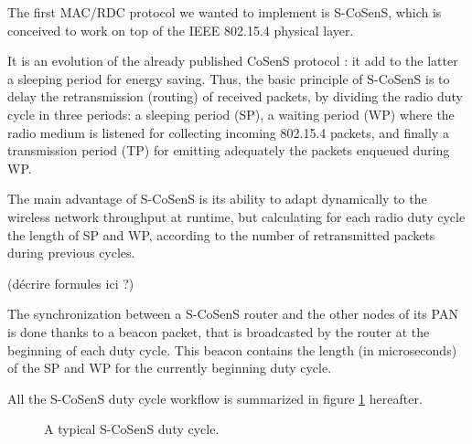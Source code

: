 \documentclass[a4paper,twoside]{article}
\begin{document}
The first MAC/RDC protocol we wanted to implement is S-CoSenS, which
is conceived to work on top of the IEEE 802.15.4 physical layer.

It is an evolution of the already published CoSenS protocol \cite{Cosens}:
it add to the latter a sleeping period for energy saving.
Thus, the basic principle of S-CoSenS is to delay the retransmission
(routing) of received packets, by dividing the radio duty cycle in three
periods: a sleeping period (SP), a waiting period (WP) where the radio medium
is listened for collecting incoming 802.15.4 packets, and finally
a transmission period (TP) for emitting adequately the packets enqueued
during WP.

The main advantage of S-CoSenS is its ability to adapt dynamically to the
wireless network throughput at runtime, but calculating for each radio duty
cycle the length of SP and WP, according to the number of retransmitted
packets during previous cycles.

(d\'ecrire formules ici ?)

The synchronization between a S-CoSenS router and the other nodes of its
PAN is done thanks to a beacon packet, that is broadcasted by the router
at the beginning of each duty cycle. This beacon contains the length
(in microseconds) of the SP and WP for the currently beginning duty cycle.

All the S-CoSenS duty cycle workflow is summarized in figure
\ref{FigSCosensDutyCycle} hereafter.

\begin{figure}[!h]
\centering
{}
\caption{A typical S-CoSenS duty cycle.}
\label{FigSCosensDutyCycle}
\end{figure}
\end{document}
